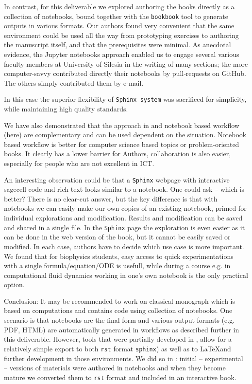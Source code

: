 \documentclass{deliverablereport}
\begin{document}
{{{In contrast, for this deliverable we explored authoring the books
directly as a collection of \Jupyter notebooks, bound together with
the \texttt{bookbook} tool to generate outputs in various formats. Our
authors found very convenient that the same environment could be used
all the way from prototyping exercises to authoring the manuscript
itself, and that the prerequisites were minimal. As anecdotal
evidence, the Jupyter notebooks approach enabled us to engage several
various faculty members at University of Silesia in the writing of
many sections; the more computer-savvy contributed directly their
notebooks by pull-requests on GitHub. The others simply contributed
them by e-mail.


In this case the superior flexibility of \texttt{Sphinx system} was
sacrificed for simplicity, while maintaining high quality standards.


We have also demonstrated that the approach in
 and notebook based workflow (here) are
complementary and can be used dependent on the situation. Notebook
based workflow is better for computer science based topics or
problem-oriented books. It clearly has a lower barrier for Authors,
collaboration is also easier, especially for people who are not
excellent in ICT.

An interesting observation could be that a \texttt{Sphinx} webpage with
interactive sagecell code and rich text looks similar to a \Jupyter notebook.
One could ask -- which is better? There is no clear-cut answer, but the key
difference is that with \Jupyter notebooks we can easily make our own copies of
an existing notebook, primed for individual explorations and modification.
Results and modification can be saved and shared in a single file.  In the
\texttt{Sphinx} page the exploration is even easier as it can be done in the
web version of the book, but it cannot be easily saved or modified. In each
case, authors have to decide which use case is more important. We found that
for biophysics students, easy access to quick experimentations with a single
formula/equation/ODE is usefull, while during a course e.g. in computational
fluid dynamics working in one's own notebook is the only practical option.

Conclusion: It may be recommended to work on classical monograph which
is based on computations and contains code using collection of
notebooks. One scenario is that notebooks are the final form and
various output formats (e.g. PDF, HTML) are automatically generated
in workflows as described further in this deliverable. However, tools
that were partially developed in \ODK, allow for a relatively simple
export to both \texttt{rst} format \texttt{sphinx}) as well as to
\LaTeX and further development in those environments. We did so in
: initial -- experimental -- versions of
materials were authored in notebooks and when they become mature we
converted them to \texttt{rst} format and included in an interactive
book.

}}}
\end{document}
